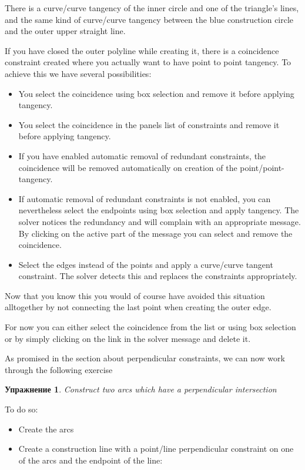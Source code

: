 \documentclass[12pt,titlepage]{article}
\newtheorem{Exercise}{Упражнение}
\begin{document}
\begin {itemize}
There is a curve/curve tangency of the inner circle and one of the triangle's
lines, and the same kind of curve/curve tangency between the blue construction circle
and the outer upper straight line.

If you have closed the outer polyline while creating it, there is a
coincidence constraint created where you actually want to have point to point
tangency. To achieve this we have several possibilities:

\begin{itemize}
\item You select the coincidence using box selection and remove it before applying tangency.
\item You select the coincidence in the panels list of constraints and remove it before applying tangency.
\item If you have enabled automatic removal of redundant constraints, the
      coincidence will be removed automatically on creation of the point/point-tangency.
\item If automatic removal of redundant constraints is not enabled, you can
      nevertheless select the endpoints using box selection and apply tangency. The
      solver notices the redundancy and will complain with an appropriate message.
      By clicking on the active part of the message you can select and remove the
      coincidence.
\item Select the edges instead of the points and apply a curve/curve tangent
      constraint. The solver detects this and replaces the constraints
      appropriately.
\end{itemize}

Now that you know this you would of course have avoided this situation
alltogether by not connecting the last point when creating the outer edge.

For now you can either select the coincidence from the list or using box selection or
by simply clicking on the link in the solver message and delete it.

As promised in the section about perpendicular constraints, we can now
work through the following exercise

\begin{Exercise}
\label{ExercisePerpendicularArcs}
Construct two arcs which have a perpendicular intersection
\end{Exercise}

To do so:
\begin{itemize}
\item Create the arcs
\item Create a construction line with a point/line perpendicular
      constraint on one of the arcs and the endpoint of the line:


\end{itemize}
\end{itemize}
\end{document}
